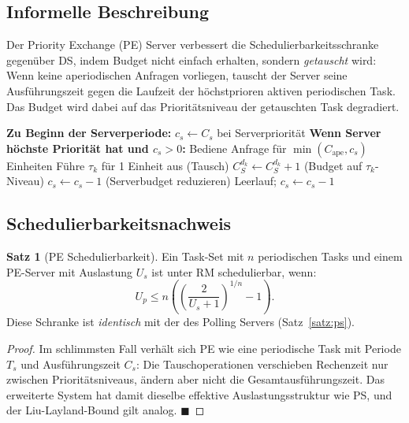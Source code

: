 ﻿\documentclass[a4paper,12pt]{report}
\theoremstyle{definition}
\newtheorem{satz}{Satz}[chapter]
\begin{document}
\subsection{Informelle Beschreibung}

Der Priority Exchange (PE) Server verbessert die Schedulierbarkeitsschranke
gegenüber DS, indem Budget nicht einfach erhalten, sondern \emph{getauscht} wird:
Wenn keine aperiodischen Anfragen vorliegen, tauscht der Server seine Ausführungszeit
gegen die Laufzeit der höchstprioren aktiven periodischen Task. Das Budget wird
dabei auf das Prioritätsniveau der getauschten Task degradiert.

\begin{algorithm}[H]
	\caption{Priority Exchange Server}
	\begin{algorithmic}[1]
		\State \textbf{Zu Beginn der Serverperiode:} $c_s \leftarrow C_s$ bei Serverpriorität
		\State
		\State \textbf{Wenn Server höchste Priorität hat und $c_s > 0$:}
		\State Bediene Anfrage für $\min(C_{\text{ape}}, c_s)$ Einheiten
		\State Führe $\tau_k$ für 1 Einheit aus (Tausch)
		\State $C_S^{d_k} \leftarrow C_S^{d_k} + 1$ (Budget auf $\tau_k$-Niveau)
		\State $c_s \leftarrow c_s - 1$ (Serverbudget reduzieren)
		\Else
		\State Leerlauf; $c_s \leftarrow c_s - 1$
		\EndIf
	\end{algorithmic}
\end{algorithm}

\subsection{Schedulierbarkeitsnachweis}

\begin{satz}[PE Schedulierbarkeit]
	\label{satz:pe}
	Ein Task-Set mit $n$ periodischen Tasks und einem PE-Server mit Auslastung
	$U_s$ ist unter RM schedulierbar, wenn:
	\[
		U_p \leq n\left(\left(\frac{2}{U_s+1}\right)^{1/n} - 1\right).
	\]
	Diese Schranke ist \emph{identisch} mit der des Polling Servers (Satz~\ref{satz:ps}).
\end{satz}

\begin{proof}
	Im schlimmsten Fall verhält sich PE wie eine periodische Task mit Periode $T_s$
	und Ausführungszeit $C_s$: Die Tauschoperationen verschieben Rechenzeit nur
	zwischen Prioritätsniveaus, ändern aber nicht die Gesamtausführungszeit. Das
	erweiterte System hat damit dieselbe effektive Auslastungsstruktur wie PS,
	und der Liu-Layland-Bound gilt analog. \hfill$\blacksquare$
\end{proof}
\end{document}
